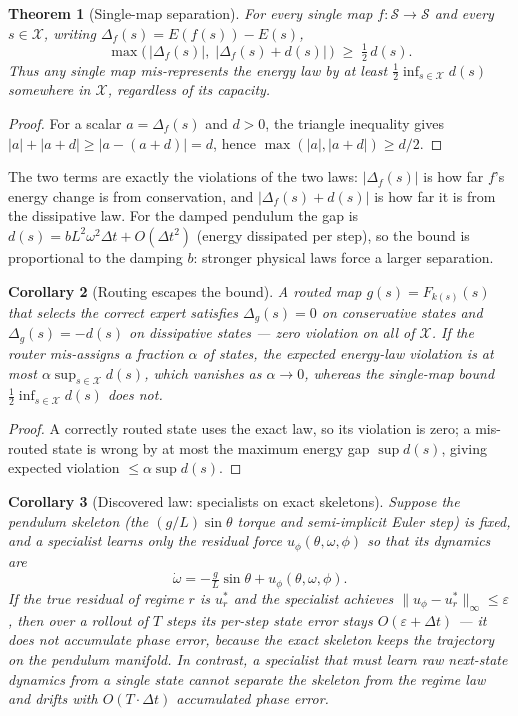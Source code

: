 \documentclass[11pt,a4paper]{article}
\newtheorem{theorem}{Theorem}
\newtheorem{corollary}[theorem]{Corollary}
\begin{document}
\begin{theorem}[Single-map separation]
\label{thm:separation}
For every single map $f:\mathcal{S}\to\mathcal{S}$ and every $s\in\mathcal{X}$,
writing $\Delta_f(s)=E(f(s))-E(s)$,
\[
  \max\big(\,|\Delta_f(s)|,\; |\Delta_f(s)+d(s)|\,\big)
  \;\geq\; \tfrac{1}{2}\,d(s).
\]
Thus any single map mis-represents the energy law by at least
$\tfrac12\inf_{s\in\mathcal{X}} d(s)$ somewhere in $\mathcal{X}$, regardless of
its capacity.
\end{theorem}

\begin{proof}
For a scalar $a=\Delta_f(s)$ and $d>0$, the triangle inequality gives
$|a|+|a+d|\ge|a-(a+d)|=d$, hence $\max(|a|,|a+d|)\ge d/2$.
\end{proof}

The two terms are exactly the violations of the two laws: $|\Delta_f(s)|$ is
how far $f$'s energy change is from conservation, and $|\Delta_f(s)+d(s)|$ is
how far it is from the dissipative law. For the damped pendulum the gap is
$d(s) = b L^2 \omega^2 \Delta t + O(\Delta t^2)$ (energy dissipated per step), so
the bound is proportional to the damping $b$: stronger physical laws force a
larger separation.

\begin{corollary}[Routing escapes the bound]
\label{cor:separation}
A routed map $g(s)=F_{k(s)}(s)$ that selects the correct expert satisfies
$\Delta_g(s)=0$ on conservative states and $\Delta_g(s)=-d(s)$ on dissipative
states --- zero violation on all of $\mathcal{X}$. If the router mis-assigns a
fraction $\alpha$ of states, the expected energy-law violation is at most
$\alpha\sup_{s\in\mathcal{X}}d(s)$, which vanishes as $\alpha\to0$, whereas the
single-map bound $\tfrac12\inf_{s\in\mathcal{X}}d(s)$ does not.
\end{corollary}

\begin{proof}
A correctly routed state uses the exact law, so its violation is zero; a
mis-routed state is wrong by at most the maximum energy gap $\sup d(s)$, giving
expected violation $\le\alpha\sup d(s)$.
\end{proof}

\begin{corollary}[Discovered law: specialists on exact skeletons]
\label{cor:residual}
Suppose the pendulum skeleton (the $(g/L)\sin\theta$ torque and semi-implicit
Euler step) is fixed, and a specialist learns only the residual force
$u_\phi(\theta,\omega,\phi)$ so that its dynamics are
\[
  \dot\omega = -\tfrac{g}{L}\sin\theta + u_\phi(\theta,\omega,\phi).
\]
If the true residual of regime $r$ is $u^*_r$ and the specialist achieves
$\|u_\phi - u^*_r\|_\infty \le \varepsilon$, then over a rollout of $T$ steps
its per-step state error stays $O(\varepsilon + \Delta t)$ --- it does not
accumulate phase error, because the exact skeleton keeps the trajectory on the
pendulum manifold. In contrast, a specialist that must learn raw next-state
dynamics from a single state cannot separate the skeleton from the regime law
and drifts with $O(T\cdot\Delta t)$ accumulated phase error.
\end{corollary}
\end{document}
